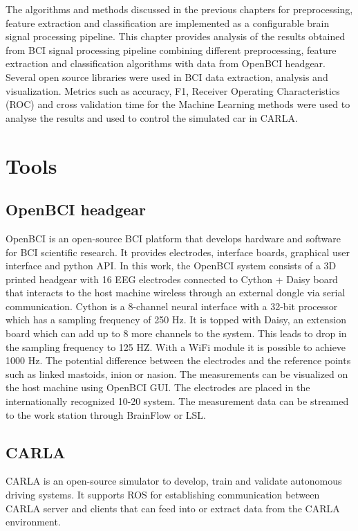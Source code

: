  The algorithms and methods discussed in the previous chapters for preprocessing, feature extraction and classification are implemented as a configurable brain signal processing pipeline. This chapter provides analysis of the results obtained from BCI signal processing pipeline combining different preprocessing, feature extraction and classification algorithms with data from OpenBCI headgear. Several open source libraries were used in BCI data extraction, analysis and visualization. Metrics such as accuracy, F1, Receiver Operating Characteristics (ROC) and cross validation time for the Machine Learning methods were used to analyse the results and used to control the simulated car in CARLA.

\section{Tools}
\subsection{OpenBCI headgear}
OpenBCI is an open-source BCI platform that develops hardware and software for BCI scientific research. It provides electrodes, interface boards, graphical user interface and python API. In this work, the OpenBCI system consists of a 3D printed headgear with 16 EEG electrodes connected to Cython + Daisy board that interacts to the host machine wireless through an external dongle via serial communication. Cython is a 8-channel neural interface with a 32-bit processor which has a sampling frequency of 250 Hz. It is topped with Daisy, an extension board which can add up to 8 more channels to the system. This leads to drop in the sampling frequency to 125 HZ. With a WiFi module it is possible to achieve 1000 Hz. The potential difference between the electrodes and the reference points such as linked mastoids, inion or nasion. The measurements can be visualized on the host machine using OpenBCI GUI. The electrodes are placed in the internationally recognized 10-20 system. The measurement data can be streamed to the work station through BrainFlow or LSL. 

\subsection{CARLA}
CARLA \cite{2017_Carla} is an open-source simulator to develop, train and validate autonomous driving systems. It supports ROS for establishing communication between CARLA server and clients that can feed into or extract data from the CARLA environment.

